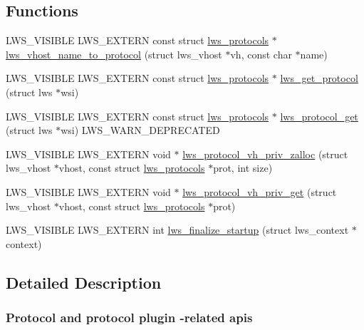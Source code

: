 \subsection*{Functions}
\begin{DoxyCompactItemize}
\item 
L\+W\+S\+\_\+\+V\+I\+S\+I\+B\+LE L\+W\+S\+\_\+\+E\+X\+T\+E\+RN const struct \hyperlink{structlws__protocols}{lws\+\_\+protocols} $\ast$ \hyperlink{group__Protocols-and-Plugins_ga25754726d97c5f519d313e691a9fe29d}{lws\+\_\+vhost\+\_\+name\+\_\+to\+\_\+protocol} (struct lws\+\_\+vhost $\ast$vh, const char $\ast$name)
\item 
L\+W\+S\+\_\+\+V\+I\+S\+I\+B\+LE L\+W\+S\+\_\+\+E\+X\+T\+E\+RN const struct \hyperlink{structlws__protocols}{lws\+\_\+protocols} $\ast$ \hyperlink{group__Protocols-and-Plugins_ga72ad550786ca7976463589d347e62112}{lws\+\_\+get\+\_\+protocol} (struct lws $\ast$wsi)
\item 
L\+W\+S\+\_\+\+V\+I\+S\+I\+B\+LE L\+W\+S\+\_\+\+E\+X\+T\+E\+RN const struct \hyperlink{structlws__protocols}{lws\+\_\+protocols} $\ast$ \hyperlink{group__Protocols-and-Plugins_ga8bbe5e65faca068845704bab911a5030}{lws\+\_\+protocol\+\_\+get} (struct lws $\ast$wsi) L\+W\+S\+\_\+\+W\+A\+R\+N\+\_\+\+D\+E\+P\+R\+E\+C\+A\+T\+ED
\item 
L\+W\+S\+\_\+\+V\+I\+S\+I\+B\+LE L\+W\+S\+\_\+\+E\+X\+T\+E\+RN void $\ast$ \hyperlink{group__Protocols-and-Plugins_gaec0c0477288ff3f83aff38d357b883d1}{lws\+\_\+protocol\+\_\+vh\+\_\+priv\+\_\+zalloc} (struct lws\+\_\+vhost $\ast$vhost, const struct \hyperlink{structlws__protocols}{lws\+\_\+protocols} $\ast$prot, int size)
\item 
L\+W\+S\+\_\+\+V\+I\+S\+I\+B\+LE L\+W\+S\+\_\+\+E\+X\+T\+E\+RN void $\ast$ \hyperlink{group__Protocols-and-Plugins_gaf3be4243443baac0f8be1fcfb4d25129}{lws\+\_\+protocol\+\_\+vh\+\_\+priv\+\_\+get} (struct lws\+\_\+vhost $\ast$vhost, const struct \hyperlink{structlws__protocols}{lws\+\_\+protocols} $\ast$prot)
\item 
L\+W\+S\+\_\+\+V\+I\+S\+I\+B\+LE L\+W\+S\+\_\+\+E\+X\+T\+E\+RN int \hyperlink{group__Protocols-and-Plugins_ga106b37ae9c247e84d191ab09441adc43}{lws\+\_\+finalize\+\_\+startup} (struct lws\+\_\+context $\ast$context)
\end{DoxyCompactItemize}


\subsection{Detailed Description}
\subsubsection*{Protocol and protocol plugin -\/related apis}

